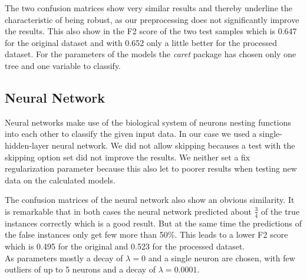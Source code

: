 

The two confusion matrices show very similar results and thereby underline the characteristic of being robust, as our preprocessing does not significantly improve the results. This also show in the F2 score of the two test samples which is 0.647 for the original dataset and with 0.652 only a little better for the processed dataset. For the parameters of the models the \textit{caret} package has chosen only one tree and one variable to classify.

\subsection{Neural Network}


Neural networks make use of the biological system of neurons nesting functions into each other to classify the given input data. In our case we used a single-hidden-layer neural network. We did not allow skipping becauses a test with the skipping option set did not improve the results. We neither set a fix regularization parameter because this also let to poorer results when testing new data on the calculated models.



The confusion matrices of the neural network also show an obvious similarity. It is remarkable that in both cases the neural network predicted about $\frac{3}{4}$ of the true instances correctly which is a good result. But at the same time the predictions of the false instances only get few more than 50\%. This leads to a lower F2 score which is 0.495 for the original and 0.523 for the processed dataset.\\
As parameters mostly a decay of $\lambda = 0$ and a single neuron are chosen, with few outliers of up to 5 neurons and a decay of $\lambda = 0.0001$.


